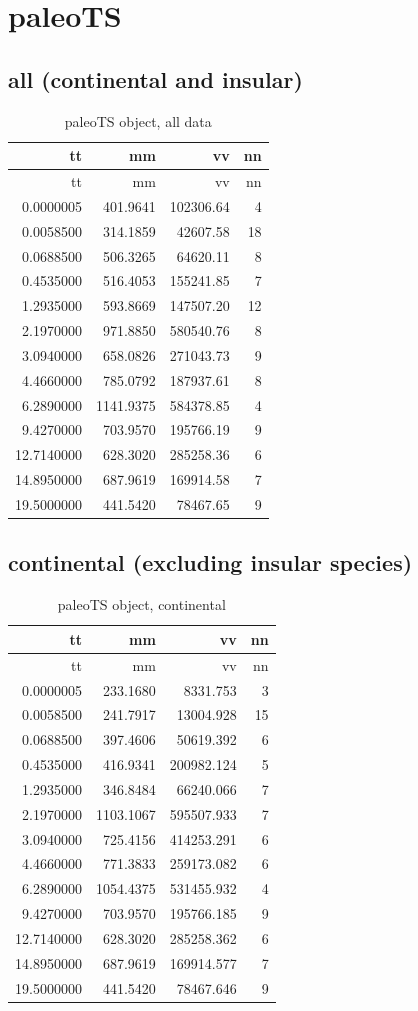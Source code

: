 \section{paleoTS}

\subsection{all (continental and
	insular)}\label{all-continental-and-insularAP}

\begin{longtable}[]{@{}rrrr@{}}
	\caption{paleoTS object, all data}
	\label{tab:pTSall}\tabularnewline
	\toprule
	tt & mm & vv & nn\tabularnewline
	\midrule
	\endfirsthead
	\toprule
	tt & mm & vv & nn\tabularnewline
	\midrule
	\endhead
	0.0000005 & 401.9641 & 102306.64 & 4\tabularnewline
	0.0058500 & 314.1859 & 42607.58 & 18\tabularnewline
	0.0688500 & 506.3265 & 64620.11 & 8\tabularnewline
	0.4535000 & 516.4053 & 155241.85 & 7\tabularnewline
	1.2935000 & 593.8669 & 147507.20 & 12\tabularnewline
	2.1970000 & 971.8850 & 580540.76 & 8\tabularnewline
	3.0940000 & 658.0826 & 271043.73 & 9\tabularnewline
	4.4660000 & 785.0792 & 187937.61 & 8\tabularnewline
	6.2890000 & 1141.9375 & 584378.85 & 4\tabularnewline
	9.4270000 & 703.9570 & 195766.19 & 9\tabularnewline
	12.7140000 & 628.3020 & 285258.36 & 6\tabularnewline
	14.8950000 & 687.9619 & 169914.58 & 7\tabularnewline
	19.5000000 & 441.5420 & 78467.65 & 9\tabularnewline
	\bottomrule
\end{longtable}


\FloatBarrier

\subsection{continental (excluding insular
	species)}\label{continental-excluding-insular-speciesAP}



\begin{longtable}[H]{@{}rrrr@{}}
	\caption{paleoTS object, continental}
	\label{tab:pTSC}\tabularnewline
	\toprule
	tt & mm & vv & nn\tabularnewline
	\midrule
	\endfirsthead
	\toprule
	tt & mm & vv & nn\tabularnewline
	\midrule
	\endhead
	0.0000005 & 233.1680 & 8331.753 & 3\tabularnewline
	0.0058500 & 241.7917 & 13004.928 & 15\tabularnewline
	0.0688500 & 397.4606 & 50619.392 & 6\tabularnewline
	0.4535000 & 416.9341 & 200982.124 & 5\tabularnewline
	1.2935000 & 346.8484 & 66240.066 & 7\tabularnewline
	2.1970000 & 1103.1067 & 595507.933 & 7\tabularnewline
	3.0940000 & 725.4156 & 414253.291 & 6\tabularnewline
	4.4660000 & 771.3833 & 259173.082 & 6\tabularnewline
	6.2890000 & 1054.4375 & 531455.932 & 4\tabularnewline
	9.4270000 & 703.9570 & 195766.185 & 9\tabularnewline
	12.7140000 & 628.3020 & 285258.362 & 6\tabularnewline
	14.8950000 & 687.9619 & 169914.577 & 7\tabularnewline
	19.5000000 & 441.5420 & 78467.646 & 9\tabularnewline
	\bottomrule
\end{longtable}


